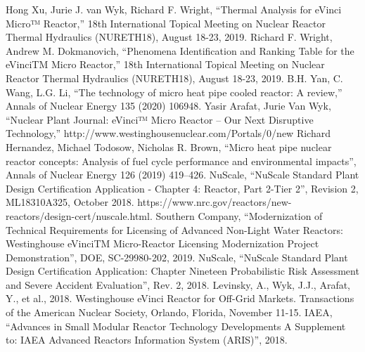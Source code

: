 \documentclass[10pt,a4paper]{article}
\begin{document}
\begin{thebibliography}{X}
 Hong Xu, Jurie J. van Wyk, Richard F. Wright, “Thermal Analysis for eVinci Micro™ Reactor,” 18th International Topical Meeting on Nuclear Reactor Thermal Hydraulics (NURETH18), August 18-23, 2019. 
 Richard F. Wright, Andrew M. Dokmanovich, “Phenomena Identification and Ranking Table for the eVinciTM Micro Reactor,” 18th International Topical Meeting on Nuclear Reactor Thermal Hydraulics (NURETH18), August 18-23, 2019. 
 B.H. Yan, C. Wang, L.G. Li, “The technology of micro heat pipe cooled reactor: A review,” Annals of Nuclear Energy 135 (2020) 106948.
 Yasir Arafat, Jurie Van Wyk, “Nuclear Plant Journal: eVinci™ Micro Reactor – Our Next Disruptive Technology,” http://www.westinghousenuclear.com/Portals/0/new%
 Richard Hernandez, Michael Todosow, Nicholas R. Brown, “Micro heat pipe nuclear reactor concepts: Analysis of fuel cycle performance and environmental impacts”, Annals of Nuclear Energy 126 (2019) 419–426.
 NuScale, “NuScale Standard Plant Design Certification Application - Chapter 4: Reactor, Part 2-Tier 2”, Revision 2, ML18310A325, October 2018. https://www.nrc.gov/reactors/new-reactors/design-cert/nuscale.html. 
 Southern Company, “Modernization of Technical Requirements for Licensing of Advanced Non-Light Water Reactors: Westinghouse eVinciTM Micro-Reactor Licensing Modernization Project Demonstration”, DOE, SC-29980-202, 2019.
 NuScale, “NuScale Standard Plant Design Certification Application: Chapter Nineteen Probabilistic Risk Assessment and Severe Accident Evaluation”, Rev. 2, 2018. 
 Levinsky, A., Wyk, J.J., Arafat, Y., et al., 2018. Westinghouse eVinci Reactor for Off-Grid Markets. Transactions of the American Nuclear Society, Orlando, Florida, November 11-15.
 IAEA, “Advances in Small Modular Reactor Technology Developments A Supplement to: IAEA Advanced Reactors Information System (ARIS)”, 2018. 

\end{thebibliography}
\end{document}
